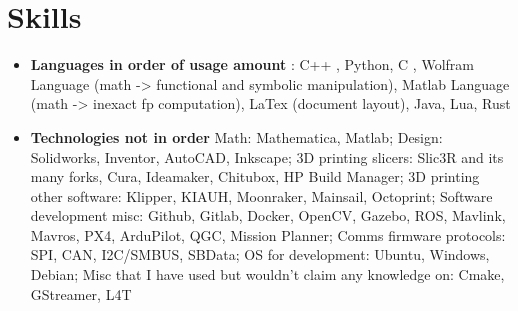 \documentclass[letterpaper,10pt]{article}
\newcommand{\resumeSubHeadingListStart}{\begin{itemize}[leftmargin=*]}
\newcommand{\resumeSubHeadingListEnd}{\end{itemize}}
\newcommand{\shorterSection}[1]{\vspace{-10pt}\section{#1}}
\begin{document}
\shorterSection{Skills}
  \resumeSubHeadingListStart
  \small
    \item{
     \textbf{Languages in order of usage amount }{: C++ , Python, C , Wolfram Language (math -> functional and symbolic manipulation),  Matlab Language (math -> inexact fp computation), LaTex (document layout), Java, Lua, Rust }}
     \item{
     \textbf{Technologies not in order}{ Math: Mathematica, Matlab; Design: Solidworks, Inventor, AutoCAD, Inkscape; 3D printing slicers: Slic3R and its many forks, Cura, Ideamaker, Chitubox, HP Build Manager; 3D printing other software: Klipper, KIAUH, Moonraker, Mainsail, Octoprint; Software development misc: Github, Gitlab, Docker, OpenCV, Gazebo, ROS, Mavlink, Mavros, PX4, ArduPilot, QGC, Mission Planner; Comms firmware protocols: SPI, CAN, I2C/SMBUS, SBData; OS for development: Ubuntu, Windows, Debian; Misc that I have used but wouldn't claim any knowledge on: Cmake, GStreamer, L4T}
    }
\resumeSubHeadingListEnd
\end{document}
